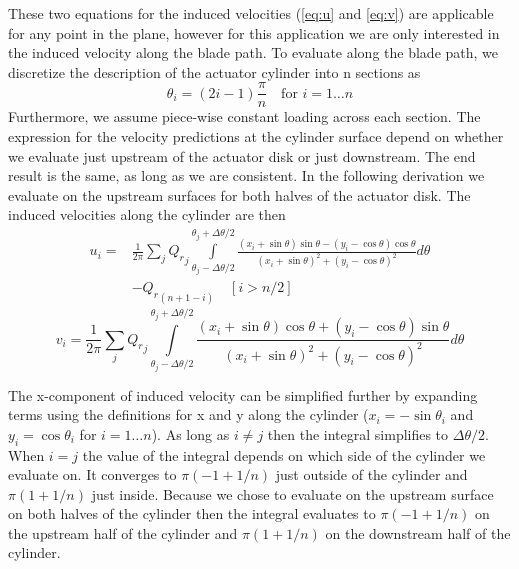 \documentclass{article}
\begin{document}
These two equations for the induced velocities (\eqref{eq:u} and \eqref{eq:v}) are applicable for any point in the plane, however for this application we are only interested in the induced velocity along the blade path.  To evaluate along the blade path, we discretize the description of the actuator cylinder into n sections as
\begin{equation}
\theta_i = (2i - 1) \frac{\pi}{n}  \quad \textrm{for } i = 1 \ldots n
\end{equation}
Furthermore, we assume piece-wise constant loading across each section.  The expression for the velocity predictions at the cylinder surface depend on whether we evaluate just upstream of the actuator disk or just downstream.  The end result is the same, as long as we are consistent.  In the following derivation we evaluate on the upstream surfaces for both halves of the actuator disk. The induced velocities along the cylinder are then
\begin{equation}
\begin{aligned}
u_i =& \frac{1}{2\pi} \sum\limits_j  {Q_r}_j  \int\limits_{\theta_j - \Delta\theta/2}^{\theta_j + \Delta\theta/2} \frac{(x_i+\sin\theta)\sin\theta - (y_i-\cos\theta)\cos\theta}{(x_i+\sin\theta)^2 + (y_i-\cos\theta)^2} d\theta  \\
&- {Q_r}_{(n+1-i)}\quad [i > n/2]
\end{aligned}
\end{equation}
\begin{equation}
v_i = \frac{1}{2\pi} \sum\limits_j  {Q_r}_j  \int\limits_{\theta_j - \Delta\theta/2}^{\theta_j + \Delta\theta/2} \frac{(x_i+\sin\theta)\cos\theta + (y_i-\cos\theta)\sin\theta}{(x_i+\sin\theta)^2 + (y_i-\cos\theta)^2} d\theta
\end{equation}


The x-component of induced velocity can be simplified further by expanding terms using the definitions for x and y along the cylinder ($x_i = -\sin\theta_i$ and $y_i = \cos\theta_i$ for $i = 1 \ldots n$).  As long as $i \neq j$ then the integral simplifies to $\Delta\theta/2$.  When $i = j$ the value of the integral depends on which side of the cylinder we evaluate on.  It converges to $\pi(-1 + 1/n)$ just outside of the cylinder and $\pi(1 + 1/n)$ just inside.  Because we chose to evaluate on the upstream surface on both halves of the cylinder then the integral evaluates to $\pi(-1 + 1/n)$ on the upstream half of the cylinder and $\pi(1 + 1/n)$ on the downstream half of the cylinder.
\end{document}
